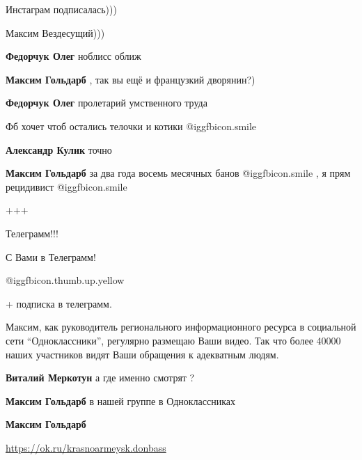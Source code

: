  
 
 
 
 
\zzSecCmt

\begin{itemize} %
Инстаграм подписалась)))

Максим Вездесущий)))

\textbf{Федорчук Олег} ноблисс оближ

\textbf{Максим Гольдарб} , так вы ещё и французкий дворянин?)

\textbf{Федорчук Олег} пролетарий умственного труда

Фб хочет чтоб остались телочки и котики  @igg{fbicon.smile} 

\begin{itemize} %
\textbf{Александр Кулик} точно

\textbf{Максим Гольдарб} за два года восемь месячных банов  @igg{fbicon.smile} , я прям рецидивист  @igg{fbicon.smile} 
\end{itemize} %

+++

Телеграмм!!!

С Вами в Телеграмм!

 @igg{fbicon.thumb.up.yellow} 

+ подписка в телеграмм.


Максим, как руководитель регионального информационного ресурса в социальной
сети \enquote{Одноклассники}, регулярно размещаю Ваши видео. Так что более 40000 наших
участников видят Ваши обращения к адекватным людям.

\begin{itemize} %
\textbf{Виталий Меркотун} а где именно смотрят ?

\textbf{Максим Гольдарб} в нашей группе в Одноклассниках

\textbf{Максим Гольдарб} 

\url{https://ok.ru/krasnoarmeysk.donbass}

\end{itemize} %

\end{itemize} %

